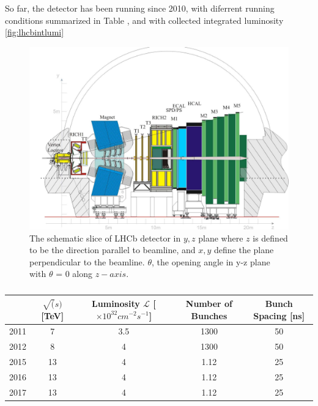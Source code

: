 So far, the detector has been running since 2010, with diferrent running conditions summarized in Table , and with collected integrated luminosity \autoref{fig:lhcbintlumi}


\begin{figure}
	\centering
	\includegraphics[scale = 0.15]{figs/detector/lhcbdet.pdf}
	\caption{The schematic slice of LHCb detector in $y,z$ plane where $z$ is defined to be the direction parallel to beamline, and $x,y$ define the plane perpendicular to the beamline. $\theta$, the opening angle in y-z plane with $\theta$ = 0 along $z-axis$.}
	\label{fig:LHCbDetector}
\end{figure}



\begin{table}[!h]
	\centering
	\hspace*{-0.8cm}
	\begin{tabular}{l c c c c }
		\hline
		 & $\sqrt(s)$ [TeV] & Luminosity $\mathcal{L}$ [$\times10^{32} cm^{-2}
		s^{-1}$] & Number of Bunches & Bunch Spacing [ns] \\ \hline
		2011 & 7  & 3.5 & 1300 &  50\\
		2012 & 8 & 4 & 1300 &  50\\
		2015 & 13 & 4 &  1.12 &  25\\      
		2016 & 13 & 4 &  1.12 &  25\\\hline      
		2017 & 13 & 4 &  1.12 &  25\\\hline      
	\end{tabular}
	\caption{}
	\label{tab:runcond}
\end{table}   

